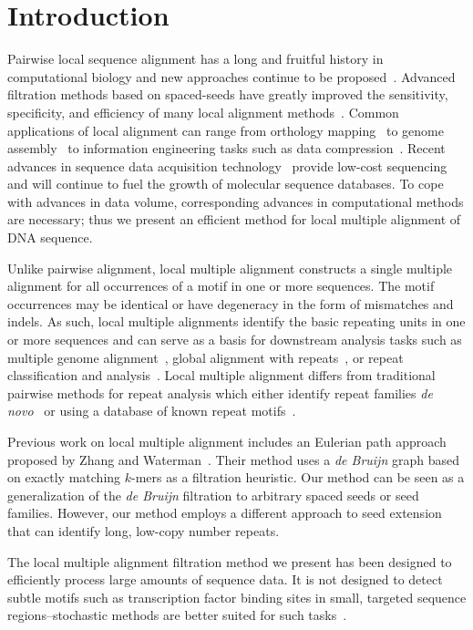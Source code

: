 \documentclass{llncs}
\begin{document}
\section{ Introduction }
Pairwise local sequence alignment has a long and fruitful history
in computational biology and new approaches continue to be
proposed~\cite{ref-pattern,ref-chaos,ref-yass,ref-kahveciMAP}.
Advanced filtration methods based on spaced-seeds have greatly
improved the sensitivity, specificity, and efficiency of many
local alignment
methods~\cite{ref-zhang04,ref-zhang06,ref-buhler05,ref-xu04,ref-batzoglouNAR}.
Common applications of local alignment can range from orthology
mapping~\cite{ref-orthomcl} to genome assembly~\cite{ref-arachne2}
to information engineering tasks such as data
compression~\cite{ref-ane}. Recent advances in sequence data
acquisition technology~\cite{ref-454} provide low-cost sequencing
and will continue to fuel the growth of molecular sequence
databases. To cope with advances in data volume, corresponding
advances in computational methods are necessary; thus we present
an efficient method for local multiple alignment of DNA sequence.

Unlike pairwise alignment, local multiple alignment constructs a
single multiple alignment for all occurrences of a motif in one or
more sequences.  The motif occurrences may be identical or have
degeneracy in the form of mismatches and indels.  As such, local
multiple alignments identify the basic repeating units in one or
more sequences and can serve as a basis for downstream analysis
tasks such as multiple genome
alignment~\cite{ref-mauve,ref-mga,ref-mgcat,ref-deweyReview}, global
alignment with repeats~\cite{ref-otherSammethPaper,ref-aba}, or
repeat classification and analysis~\cite{ref-piler}.  Local multiple
alignment differs from traditional pairwise methods for repeat
analysis which either identify repeat families \textit{de
novo}~\cite{ref-reputer} or using a database of known repeat
motifs~\cite{ref-repbase}.

Previous work on local multiple alignment includes an Eulerian path
approach proposed by Zhang and Waterman~\cite{ref-related1}. Their
method uses a \textit{de Bruijn} graph based on exactly matching
$k$-mers as a filtration heuristic. Our method can be seen as a
generalization of the \textit{de Bruijn} filtration to arbitrary
spaced seeds or seed families.  However, our method employs a
different approach to seed extension that can identify long,
low-copy number repeats.

The local multiple alignment filtration method we present has been
designed to efficiently process large amounts of sequence data.  It
is not designed to detect subtle motifs such as transcription factor
binding sites in small, targeted sequence regions--stochastic
methods are better suited for such tasks~\cite{ref-PhyloGibbs}.
\end{document}
